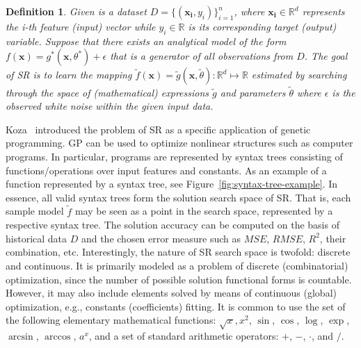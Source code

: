 \documentclass{bmcart}
\newtheorem{definition}{Definition}
\begin{document}
\begin{definition}
	Given is a dataset $D = \{(\mathbf{x_i}, y_i)\}_{i=1}^n$, where $\mathbf{x_i} \in \mathbb{R}^d$ represents the i-th feature (input) vector while $y_i \in \mathbb{R}$ is its corresponding target (output) variable. Suppose that there exists an analytical model of the form $f(\mathbf{x})= g^*(\mathbf{x}, \theta^*) + \epsilon $ that is a generator of all observations from $D$.  
	The goal of SR is to learn the mapping $\tilde{f}(\mathbf{x})=  \tilde{g}(\mathbf{x}, \tilde{\theta})  \colon \mathbb{R}^d \mapsto \mathbb{R}$  estimated by searching through the space of (mathematical) expressions  $\tilde{g}$ and parameters $\tilde{\theta}$ where  $\epsilon$ is the observed white noise within the given input data. 
	
\end{definition}

Koza~\cite{koza1994genetic} introduced the problem of SR as a specific application of genetic programming. GP can be used to optimize nonlinear structures such as computer programs. In particular, programs are represented by syntax trees consisting of functions/operations over input features and constants. As an example of a function represented by a syntax tree, see Figure~\ref{fig:syntax-tree-example}. In essence, all valid syntax trees form the solution search space of SR. That is, each sample model $\tilde{f}$ may be seen as a point in the search space, represented by a respective syntax tree. The solution accuracy can be computed on the basis of historical data $D$ and the chosen error measure such as $MSE$, $RMSE$, $R^2$, their combination, etc. Interestingly, the nature of SR search space is twofold: discrete and continuous. It is primarily modeled as a problem of discrete (combinatorial) optimization, since the number of possible solution functional forms is countable. However, it may also include elements solved by means of continuous (global) optimization, e.g., constants (coefficients) fitting. It is common to use the set of the following elementary mathematical functions: $\sqrt{x}, x^2 $, $\sin$, $\cos$, $\log$, $\exp$, $\arcsin$, $\arccos$, $a^x$, and a set of standard arithmetic operators: $+$, $-$, $\cdot$, and $/$. 
\end{document}
